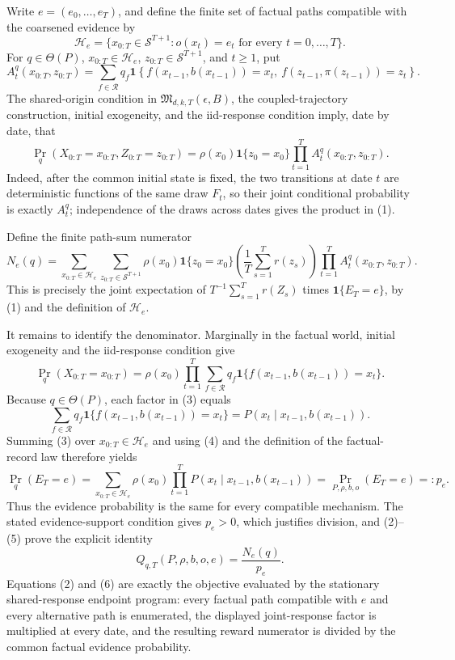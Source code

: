 Write \(e=(e_0,\ldots,e_T)\), and define the finite set of factual paths compatible with the coarsened evidence by
\[
 \mathcal H_e
 =\{x_{0:T}\in\mathcal S^{T+1}:o(x_t)=e_t\text{ for every }t=0,\ldots,T\}.
\]
For \(q\in\Theta(P)\), \(x_{0:T}\in\mathcal H_e\), \(z_{0:T}\in\mathcal S^{T+1}\), and \(t\geq 1\), put
\[
 A_t^q(x_{0:T},z_{0:T})
 =\sum_{f\in\mathcal R}q_f
 \mathbf 1\!\left\{f(x_{t-1},b(x_{t-1}))=x_t,\ 
 f(z_{t-1},\pi(z_{t-1}))=z_t\right\}.
\]
The shared-origin condition in \(\mathfrak M_{d,k,T}(\epsilon,B)\), the coupled-trajectory construction, initial exogeneity, and the iid-response condition imply, date by date, that
\[
 \Pr_q(X_{0:T}=x_{0:T},Z_{0:T}=z_{0:T})
 =\rho(x_0)\mathbf 1\{z_0=x_0\}
   \prod_{t=1}^T A_t^q(x_{0:T},z_{0:T}).                                      \tag{1}
\]
Indeed, after the common initial state is fixed, the two transitions at date \(t\) are deterministic functions of the same draw \(F_t\), so their joint conditional probability is exactly \(A_t^q\); independence of the draws across dates gives the product in (1).

Define the finite path-sum numerator
\[
 N_e(q)=
 \sum_{x_{0:T}\in\mathcal H_e}
 \sum_{z_{0:T}\in\mathcal S^{T+1}}
 \rho(x_0)\mathbf 1\{z_0=x_0\}
 \left(\frac1T\sum_{s=1}^T r(z_s)\right)
 \prod_{t=1}^T A_t^q(x_{0:T},z_{0:T}).                                      \tag{2}
\]
This is precisely the joint expectation of \(T^{-1}\sum_{s=1}^T r(Z_s)\) times \(\mathbf 1\{E_T=e\}\), by (1) and the definition of \(\mathcal H_e\).

It remains to identify the denominator.  Marginally in the factual world, initial exogeneity and the iid-response condition give
\[
 \Pr_q(X_{0:T}=x_{0:T})
 =\rho(x_0)\prod_{t=1}^T
   \sum_{f\in\mathcal R}q_f
   \mathbf 1\{f(x_{t-1},b(x_{t-1}))=x_t\}.                                 \tag{3}
\]
Because \(q\in\Theta(P)\), each factor in (3) equals
\[
 \sum_{f\in\mathcal R}q_f
 \mathbf 1\{f(x_{t-1},b(x_{t-1}))=x_t\}
 =P(x_t\mid x_{t-1},b(x_{t-1})).                                           \tag{4}
\]
Summing (3) over \(x_{0:T}\in\mathcal H_e\) and using (4) and the definition of the factual-record law therefore yields
\[
 \Pr_q(E_T=e)
 =\sum_{x_{0:T}\in\mathcal H_e}\rho(x_0)
   \prod_{t=1}^T P(x_t\mid x_{t-1},b(x_{t-1}))
 =\Pr_{P,\rho,b,o}(E_T=e)=:p_e.                                            \tag{5}
\]
Thus the evidence probability is the same for every compatible mechanism.  The stated evidence-support condition gives \(p_e>0\), which justifies division, and (2)--(5) prove the explicit identity
\[
 Q_{q,T}(P,\rho,b,o,e)=\frac{N_e(q)}{p_e}.                                  \tag{6}
\]
Equations (2) and (6) are exactly the objective evaluated by the stationary shared-response endpoint program: every factual path compatible with \(e\) and every alternative path is enumerated, the displayed joint-response factor is multiplied at every date, and the resulting reward numerator is divided by the common factual evidence probability.

